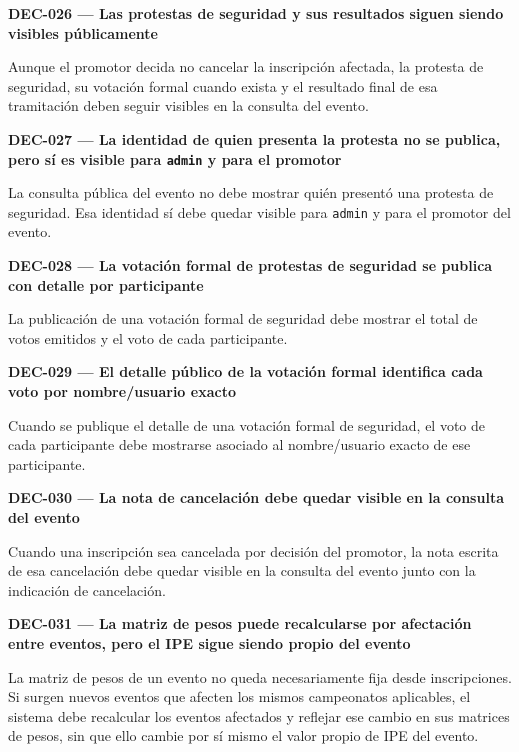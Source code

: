 \documentclass[10pt,letterpaper]{article}
\begin{document}
\noindent\textbf{DEC-026 --- Las protestas de seguridad y sus resultados siguen siendo visibles públicamente}\par
Aunque el promotor decida no cancelar la inscripción afectada, la protesta de seguridad, su votación formal cuando exista y el resultado final de esa tramitación deben seguir visibles en la consulta del evento.\par\vspace{0.45em}
\noindent\textbf{DEC-027 --- La identidad de quien presenta la protesta no se publica, pero sí es visible para \texttt{admin} y para el promotor}\par
La consulta pública del evento no debe mostrar quién presentó una protesta de seguridad. Esa identidad sí debe quedar visible para \texttt{admin} y para el promotor del evento.\par\vspace{0.45em}
\noindent\textbf{DEC-028 --- La votación formal de protestas de seguridad se publica con detalle por participante}\par
La publicación de una votación formal de seguridad debe mostrar el total de votos emitidos y el voto de cada participante.\par\vspace{0.45em}
\noindent\textbf{DEC-029 --- El detalle público de la votación formal identifica cada voto por nombre/usuario exacto}\par
Cuando se publique el detalle de una votación formal de seguridad, el voto de cada participante debe mostrarse asociado al nombre/usuario exacto de ese participante.\par\vspace{0.45em}
\noindent\textbf{DEC-030 --- La nota de cancelación debe quedar visible en la consulta del evento}\par
Cuando una inscripción sea cancelada por decisión del promotor, la nota escrita de esa cancelación debe quedar visible en la consulta del evento junto con la indicación de cancelación.\par\vspace{0.45em}
\noindent\textbf{DEC-031 --- La matriz de pesos puede recalcularse por afectación entre eventos, pero el IPE sigue siendo propio del evento}\par
La matriz de pesos de un evento no queda necesariamente fija desde inscripciones. Si surgen nuevos eventos que afecten los mismos campeonatos aplicables, el sistema debe recalcular los eventos afectados y reflejar ese cambio en sus matrices de pesos, sin que ello cambie por sí mismo el valor propio de IPE del evento.\par\vspace{0.45em}
\end{document}
